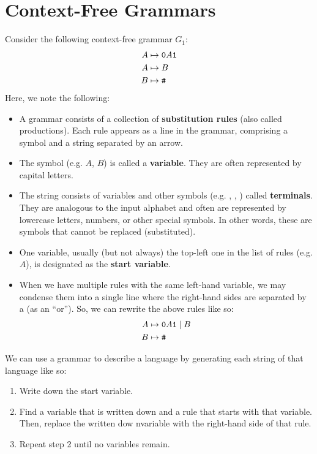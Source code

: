 \documentclass[letterpaper]{article}
\begin{document}
\section{Context-Free Grammars}
Consider the following context-free grammar $G_1$:
\begin{equation*}
    \begin{aligned}
        A &\mapsto \texttt{0}A\texttt{1} \\ 
        A &\mapsto B \\ 
        B &\mapsto \texttt{\#}
    \end{aligned}
\end{equation*}
Here, we note the following:  
\begin{itemize}
    \item A grammar consists of a collection of \textbf{substitution rules} (also called productions). Each rule appears as a line in the grammar, comprising a symbol and a string separated by an arrow. 
    \item The symbol (e.g. $A$, $B$) is called a \textbf{variable}. They are often represented by capital letters.  
    \item The string consists of variables and other symbols (e.g. , , \code{\#}) called \textbf{terminals}. They are analogous to the input alphabet and often are represented by lowercase letters, numbers, or other special symbols. In other words, these are symbols that cannot be replaced (substituted). 
    \item One variable, usually (but not always) the top-left one in the list of rules (e.g. $A$), is designated as the \textbf{start variable}.
    \item When we have multiple rules with the same left-hand variable, we may condense them into a single line where the right-hand sides are separated by a \code{|} (as an ``or''). So, we can rewrite the above rules like so: 
    \begin{equation*}
        \begin{aligned}
            A &\mapsto \texttt{0}A\texttt{1} \mid B \\
            B &\mapsto \texttt{\#}
        \end{aligned}
    \end{equation*}
\end{itemize}
We can use a grammar to describe a language by generating each string of that language like so: 
\begin{enumerate}
    \item Write down the start variable. 
    \item Find a variable that is written down and a rule that starts with that variable. Then, replace the written dow nvariable with the right-hand side of that rule. 
    \item Repeat step 2 until no variables remain. 
\end{enumerate}
\end{document}
